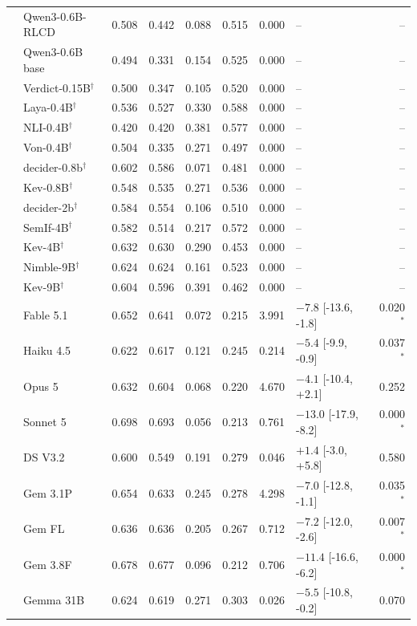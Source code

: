 \begin{longtable}{llrrrrrlr}
 & Qwen3-0.6B-RLCD & 0.508 & 0.442 & 0.088 & 0.515 & 0.000 & -- & -- \\
 & Qwen3-0.6B base & 0.494 & 0.331 & 0.154 & 0.525 & 0.000 & -- & -- \\
 & Verdict-0.15B$^{\dagger}$ & 0.500 & 0.347 & 0.105 & 0.520 & 0.000 & -- & -- \\
 & Laya-0.4B$^{\dagger}$ & 0.536 & 0.527 & 0.330 & 0.588 & 0.000 & -- & -- \\
 & NLI-0.4B$^{\dagger}$ & 0.420 & 0.420 & 0.381 & 0.577 & 0.000 & -- & -- \\
 & Von-0.4B$^{\dagger}$ & 0.504 & 0.335 & 0.271 & 0.497 & 0.000 & -- & -- \\
 & decider-0.8b$^{\dagger}$ & 0.602 & 0.586 & 0.071 & 0.481 & 0.000 & -- & -- \\
 & Kev-0.8B$^{\dagger}$ & 0.548 & 0.535 & 0.271 & 0.536 & 0.000 & -- & -- \\
 & decider-2b$^{\dagger}$ & 0.584 & 0.554 & 0.106 & 0.510 & 0.000 & -- & -- \\
 & SemIf-4B$^{\dagger}$ & 0.582 & 0.514 & 0.217 & 0.572 & 0.000 & -- & -- \\
 & Kev-4B$^{\dagger}$ & 0.632 & 0.630 & 0.290 & 0.453 & 0.000 & -- & -- \\
 & Nimble-9B$^{\dagger}$ & 0.624 & 0.624 & 0.161 & 0.523 & 0.000 & -- & -- \\
 & Kev-9B$^{\dagger}$ & 0.604 & 0.596 & 0.391 & 0.462 & 0.000 & -- & -- \\
 & Fable 5.1 & 0.652 & 0.641 & 0.072 & 0.215 & 3.991 & $-7.8$ [-13.6, -1.8] & 0.020$^{*}$ \\
 & Haiku 4.5 & 0.622 & 0.617 & 0.121 & 0.245 & 0.214 & $-5.4$ [-9.9, -0.9] & 0.037$^{*}$ \\
 & Opus 5 & 0.632 & 0.604 & 0.068 & 0.220 & 4.670 & $-4.1$ [-10.4, +2.1] & 0.252 \\
 & Sonnet 5 & 0.698 & 0.693 & 0.056 & 0.213 & 0.761 & $-13.0$ [-17.9, -8.2] & 0.000$^{*}$ \\
 & DS V3.2 & 0.600 & 0.549 & 0.191 & 0.279 & 0.046 & $+1.4$ [-3.0, +5.8] & 0.580 \\
 & Gem 3.1P & 0.654 & 0.633 & 0.245 & 0.278 & 4.298 & $-7.0$ [-12.8, -1.1] & 0.035$^{*}$ \\
 & Gem FL & 0.636 & 0.636 & 0.205 & 0.267 & 0.712 & $-7.2$ [-12.0, -2.6] & 0.007$^{*}$ \\
 & Gem 3.8F & 0.678 & 0.677 & 0.096 & 0.212 & 0.706 & $-11.4$ [-16.6, -6.2] & 0.000$^{*}$ \\
 & Gemma 31B & 0.624 & 0.619 & 0.271 & 0.303 & 0.026 & $-5.5$ [-10.8, -0.2] & 0.070 \\

\end{longtable}
